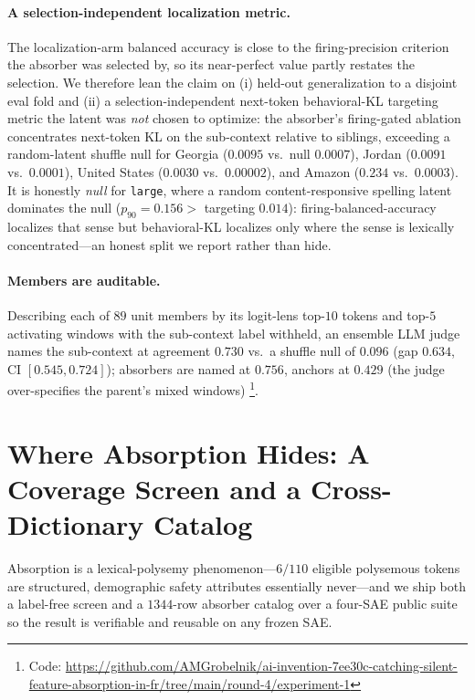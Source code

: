 \documentclass[11pt,letterpaper]{article}
\begin{document}
\paragraph{A selection-independent localization metric.} The localization-arm balanced accuracy is close to the firing-precision criterion the absorber was selected by, so its near-perfect value partly restates the selection. We therefore lean the claim on (i) held-out generalization to a disjoint eval fold and (ii) a selection-independent next-token behavioral-KL targeting metric the latent was \emph{not} chosen to optimize: the absorber's firing-gated ablation concentrates next-token KL on the sub-context relative to siblings, exceeding a random-latent shuffle null for Georgia ($0.0095$ vs.\ null $0.0007$), Jordan ($0.0091$ vs.\ $0.0001$), United States ($0.0030$ vs.\ $0.00002$), and Amazon ($0.234$ vs.\ $0.0003$). It is honestly \emph{null} for \texttt{large}, where a random content-responsive spelling latent dominates the null ($p_{90}{=}0.156>$ targeting $0.014$): firing-balanced-accuracy localizes that sense but behavioral-KL localizes only where the sense is lexically concentrated---an honest split we report rather than hide.

\paragraph{Members are auditable.} Describing each of $89$ unit members by its logit-lens top-$10$ tokens and top-$5$ activating windows with the sub-context label withheld, an ensemble LLM judge names the sub-context at agreement $0.730$ vs.\ a shuffle null of $0.096$ (gap $0.634$, CI $[0.545,0.724]$); absorbers are named at $0.756$, anchors at $0.429$ (the judge over-specifies the parent's mixed windows) \footnote{Code: \url{https://github.com/AMGrobelnik/ai-invention-7ee30c-catching-silent-feature-absorption-in-fr/tree/main/round-4/experiment-1}}.

\section{Where Absorption Hides: A Coverage Screen and a Cross-Dictionary Catalog}
\label{sec:catalog}

Absorption is a lexical-polysemy phenomenon---$6/110$ eligible polysemous tokens are structured, demographic safety attributes essentially never---and we ship both a label-free screen and a $1344$-row absorber catalog over a four-SAE public suite so the result is verifiable and reusable on any frozen SAE.
\end{document}
